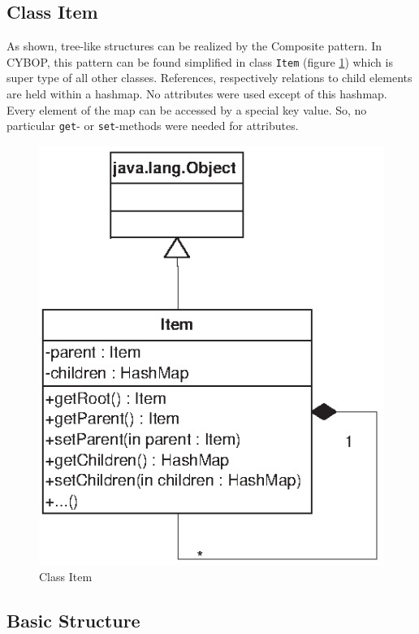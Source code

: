 \subsection{Class Item}
\label{class_item_heading}

As shown, tree-like structures can be realized by the Composite pattern. In
CYBOP, this pattern can be found simplified in class {\tt Item} (figure
\ref{class_item_figure}) which is super type of all other classes. References,
respectively relations to child elements are held within a hashmap. No attributes
were used except of this hashmap. Every element of the map can be accessed by a
special key value. So, no particular {\tt get}- or {\tt set}-methods were needed
for attributes.

\begin{figure}[ht]
    \begin{center}
       \includegraphics[scale=0.8]{eps/item.eps}
       \caption{Class Item}
       \label{class_item_figure}
    \end{center}
\end{figure}

\subsection{Basic Structure}
\label{basic_structure_heading}

